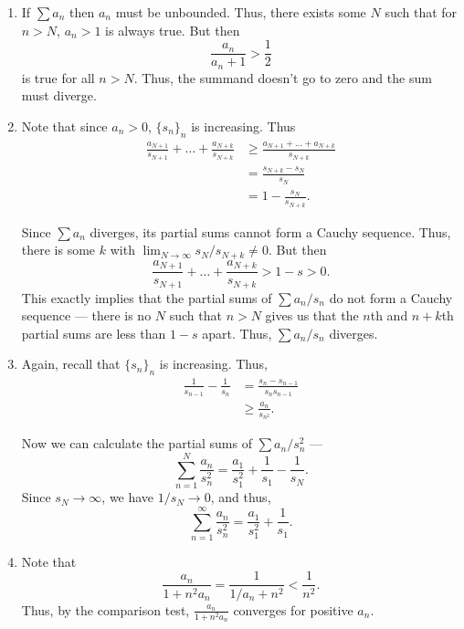 \documentclass[12 pt, letterpaper]{hmcpset}
\begin{document}
\begin{solution}
	\begin{enumerate}
		\item If $\sum a_{n}$ then $a_{n}$ must be unbounded. Thus, there exists some $N$ such that for $n > N$, $a_{n} > 1$ is always true. But then
			\[
				\frac{a_{n}}{a_{n} + 1} > \frac{1}{2}
			\]
			is true for all $n > N$. Thus, the summand doesn't go to zero and the sum must diverge.
		\item Note that since $a_{n} > 0$, $\{ s_{n} \}_{n}$ is increasing. Thus
			\[
				\begin{split}
					\frac{a_{N + 1}}{s_{N + 1}} + \dots + \frac{a_{N + k}}{s_{N + k}} & \ge \frac{a_{N + 1} + \dots + a_{N + k}}{s_{N + k}} \\
					& = \frac{s_{N + k} - s_{N}}{s_{N}} \\
					& = 1 - \frac{s_{N}}{s_{N + k}}.
				\end{split}
			\]

			Since $\sum a_{n}$ diverges, its partial sums cannot form a Cauchy sequence. Thus, there is some $k$ with $\lim_{N \to \infty} s_{N}/s_{N + k} \neq 0$. But then
			\[
				\frac{a_{N + 1}}{s_{N + 1}} + \dots + \frac{a_{N + k}}{s_{N + k}} > 1 - s > 0.
			\]
			This exactly implies that the partial sums of $\sum a_{n} / s_{n}$ do not form a Cauchy sequence --- there is no $N$ such that $n > N$ gives us that the $n$th and $n + k$th partial sums are less than $1 - s$ apart. Thus, $\sum a_{n} / s_{n}$ diverges.
		\item Again, recall that  $\{ s_{n} \}_{n}$ is increasing. Thus,
			\[
				\begin{split}
					\frac{1}{s_{n - 1}} - \frac{1}{s_{n}} & = \frac{s_{n} - s_{n - 1}}{s_{n} s_{n - 1}} \\
									      & \ge \frac{a_{n}}{s_{n^{2}}}.
				\end{split}
			\]

			Now we can calculate the partial sums of $\sum a_{n} / s_{n}^{2}$ ---
			\[
					\sum_{n = 1}^{N} \frac{a_{n}}{s_{n}^{2}} = \frac{a_{1}}{s_{1}^{2}} + \frac{1}{s_{1}} - \frac{1}{s_{N}}.
			\]
			Since $s_{N} \to \infty$, we have $1/s_{N} \to 0$, and thus,
			\[
				\sum_{n = 1}^{\infty} \frac{a_{n}}{s_{n}^{2}} = \frac{a_{1}}{s_{1}^{2}} + \frac{1}{s_{1}}.
			\]
		\item Note that
			\[
				\frac{a_{n}}{1 + n^{2} a_{n}} = \frac{1}{1/a_{n} + n^{2}} < \frac{1}{n^{2}}.
			\]
			Thus, by the comparison test, $\frac{a_{n}}{1 + n^{2} a_{n}}$ converges for positive $a_{n}$.
	\end{enumerate}
\end{solution}
\end{document}
